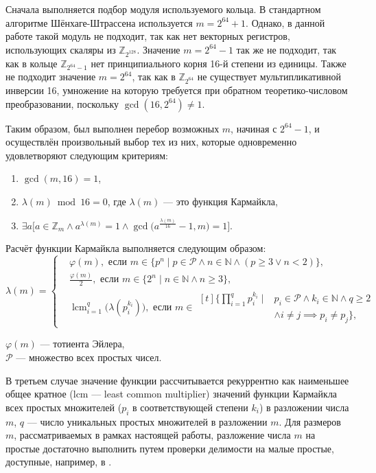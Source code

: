Сначала выполняется подбор модуля используемого кольца.
В стандартном алгоритме Шёнхаге-Штрассена используется $m=2^{64}+1$.
Однако, в данной работе такой модуль не подходит, так как нет векторных регистров, использующих скаляры из $\mathbb{Z}_{2^{128}}$. Значение $m=2^{64}-1$ так же не подходит, так как в кольце $\mathbb{Z}_{2^{64}-1}$ нет принципиального корня 16-й степени из единицы.
Также не подходит значение $m = 2^{64}$, так как в $\mathbb{Z}_{2^{64}}$ не существует мультипликативной инверсии 16, умножение на которую требуется при обратном теоретико-числовом преобразовании, поскольку $\gcd⁡(16, 2^{64}) \ne 1$.

Таким образом, был выполнен перебор возможных $m$, начиная с $2^{64}-1$, и осуществлён произвольный выбор тех из них, которые одновременно удовлетворяют следующим критериям:
\begin{enumerate}
\item $\gcd(m, 16) = 1$,
\item $\lambda(m) \bmod{16} = 0$, где $\lambda(m)$ --- это функция Кармайкла,
\item $\exists a\bigg[a \in \mathbb{Z}_m \land a^{\lambda(m)} = 1 \land \gcd\Big(a^\frac{\lambda(m)}{16} - 1, m\Big) = 1\bigg]$.
\end{enumerate}

Расчёт функции Кармайкла выполняется следующим образом:
$$
\lambda(m)=
\begin{cases}
&\varphi(m), \text{ если } m \in \big\{p^n \mid p \in \mathcal{P} \land n \in \mathbb{N} \land (p \ge 3 \lor n < 2)\big\}, \\
&\frac{\varphi(m)}{2}, \text{ если } m \in \{2^n \mid n \in \mathbb{N} \land n \ge 3\}, \\
&\operatorname{lcm}_{i=1}^q\big(\lambda(p_i^{k_i})\big), \text{ если } m \in \begin{aligned}[t]\Big\{\prod_{i=1}^q p_i^{k_i} \mid &p_i\in\mathcal{P} \land k_i\in\mathbb{N} \land q \geq 2\\
&\land i \ne j \implies p_i \ne p_j\Big\},\end{aligned}
\end{cases}
$$
\begin{whereblock}
$\varphi(m)$ --- тотиента Эйлера,\\
$\mathcal{P}$ --- множество всех простых чисел.
\end{whereblock}

В третьем случае значение функции рассчитывается рекуррентно как наименьшее общее кратное (lcm --– least common multiplier) значений функции Кармайкла всех простых множителей ($p_i$ в соответствующей степени $k_i$) в разложении числа $m$, $q$ –-- число уникальных простых множителей в разложении $m$.
Для размеров $m$, рассматриваемых в рамках настоящей работы, разложение числа $m$ на простые достаточно выполнить путем проверки делимости на малые простые, доступные, например, в \cite{IrregularPrimes, crandallprimes}.


